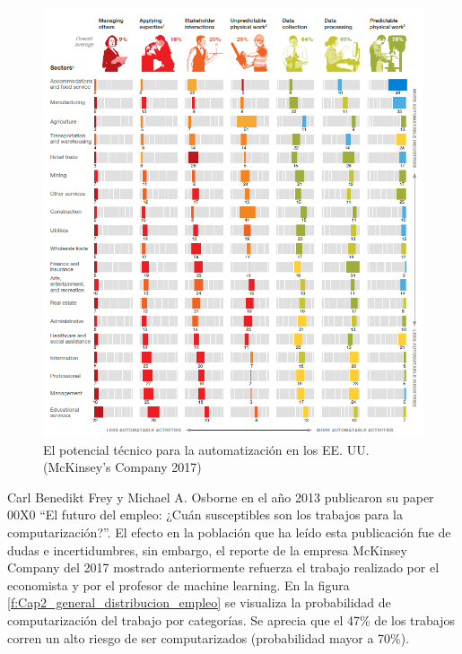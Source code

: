     \begin{figure}[h]
        \centering
        \includegraphics[width=0.9\linewidth]{Main/Chapter2/Images2/potencial-automatisacion.png}
        \caption{El potencial técnico para la automatización en los EE. UU. (McKinsey’s Company 2017)}
        \label{f:Cap2_general_potencial_automatizacion}
    \end{figure}
  
      \newpage
  
    Carl Benedikt Frey y Michael A. Osborne en el año 2013 publicaron su paper 00X0 ``El futuro del empleo: ¿Cuán susceptibles son los trabajos para la computarización?”. El efecto en la población que ha leído esta publicación fue de dudas e incertidumbres, sin embargo, el reporte de la empresa McKinsey Company del 2017 mostrado anteriormente refuerza el trabajo realizado por el economista y por el profesor de machine learning. En la figura \ref{f:Cap2_general_distribucion_empleo} se visualiza la probabilidad de computarización del trabajo por categorías. Se aprecia que el 47\% de los trabajos corren un alto riesgo de ser computarizados (probabilidad mayor a 70\%).
    
